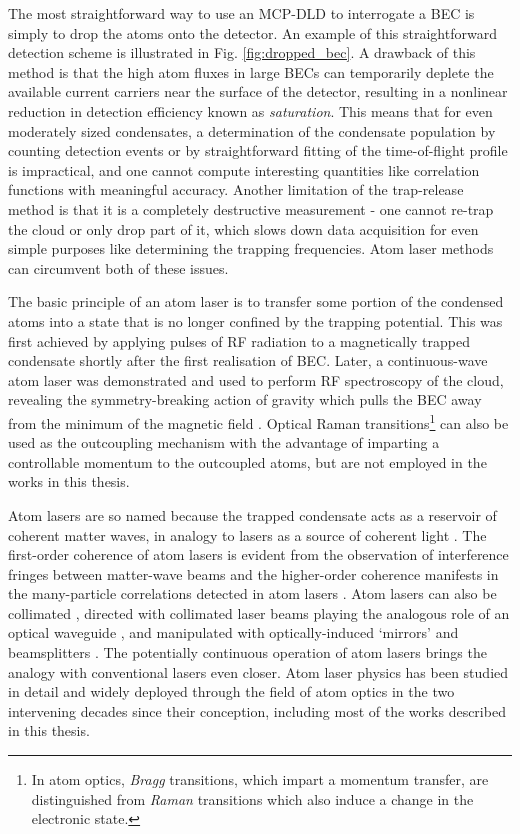 	The most straightforward way to use an MCP-DLD to interrogate a BEC is simply to drop the atoms onto the detector.
	An example of this straightforward detection scheme is illustrated in Fig.
	\ref{fig:dropped_bec}.
	A drawback of this method is that the high atom fluxes in large BECs can temporarily deplete the available current carriers near the surface of the detector, resulting in a nonlinear reduction in detection efficiency known as \emph{saturation}.
	This means that for even moderately sized condensates, a determination of the condensate population by counting detection events or by straightforward fitting of the time-of-flight profile is impractical, and one cannot compute interesting quantities like correlation functions with meaningful accuracy.
	Another limitation of the trap-release method is that it is a completely destructive measurement - one cannot re-trap the cloud or only drop part of it, which slows down data acquisition for even simple purposes like determining the trapping frequencies.
	Atom laser methods can circumvent both of these issues.
	

	The basic principle of an atom laser is to transfer some portion of the condensed atoms into a state that is no longer confined by the trapping potential.
	This was first achieved by applying pulses of RF radiation to a magnetically trapped condensate shortly after the first realisation of BEC\cite{Mewes97}.
	Later, a continuous-wave atom laser was demonstrated and used to perform RF spectroscopy of the cloud, revealing the symmetry-breaking action of gravity which pulls the BEC away from the minimum of the magnetic field \cite{Bloch99}.
	Optical Raman transitions\footnote{In atom optics, \emph{Bragg} transitions, which impart a momentum transfer, are distinguished from  \emph{Raman} transitions which also induce a change in the electronic state.} can also be used as the outcoupling mechanism \cite{Hagley99} with the advantage of imparting a controllable momentum to the outcoupled atoms, but are not employed in the works in this thesis.
	

	Atom lasers are so named because the trapped condensate acts as a reservoir of coherent matter waves, in analogy to lasers as a source of coherent light \cite{Narashewski,GlauberXX}.
	The first-order coherence of atom lasers is evident from the observation of interference fringes between matter-wave beams \cite{Andrews97} and the higher-order coherence manifests in the many-particle correlations detected in \mhe atom lasers \cite{SomeMorePapers}.
	Atom lasers can also be collimated \cite{Bloch99}, directed with collimated laser beams playing the analogous role of an optical waveguide \cite{Guerin06,Couvert08}, and manipulated with optically-induced `mirrors' and beamsplitters \cite{Bloch01}.
	The potentially continuous operation of atom lasers \cite{Chikkatur02} brings the analogy with conventional lasers even closer.
	Atom laser physics has been studied in detail and widely deployed through the field of atom optics in the two intervening decades since their conception, including most of the works described in this thesis.
	
